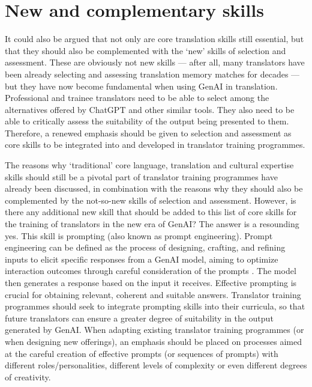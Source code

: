 \documentclass[output=paper]{langscibook}
\begin{document}
\section{New and complementary skills}
It could also be argued that not only are core translation skills still essential, but that they should also be complemented with the ‘new’ skills of selection and assessment. These are obviously not new skills — after all, many translators have been already selecting and assessing translation memory matches for decades — but they have now become fundamental when using GenAI in translation. Professional and trainee translators need to be able to select among the alternatives offered by ChatGPT and other similar tools. They also need to be able to critically assess the suitability of the output being presented to them. Therefore, a renewed emphasis should be given to selection and assessment as core skills to be integrated into and developed in translator training programmes.

The reasons why ‘traditional’ core language, translation and cultural expertise skills should still be a pivotal part of translator training programmes have already been discussed, in combination with the reasons why they should also be complemented by the not-so-new skills of selection and assessment. However, is there any additional new skill that should be added to this list of core skills for the training of translators in the new era of GenAI? The answer is a resounding yes. This skill is prompting (also known as prompt engineering). Prompt engineering can be defined as the process of designing, crafting, and refining inputs to elicit specific responses from a GenAI model, aiming to optimize interaction outcomes through careful consideration of the prompts \citep{bozkurt24}. The model then generates a response based on the input it receives. Effective prompting is crucial for obtaining relevant, coherent and suitable answers. Translator training programmes should seek to integrate prompting skills into their curricula, so that future translators can ensure a greater degree of suitability in the output generated by GenAI. When adapting existing translator training programmes (or when designing new offerings), an emphasis should be placed on processes aimed at the careful creation of effective prompts (or sequences of prompts) with different roles/personalities, different levels of complexity or even different degrees of creativity.
\end{document}
